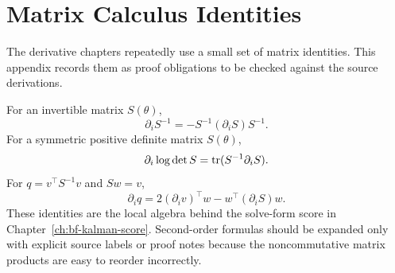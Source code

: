 \chapter{Matrix Calculus Identities}
\label{app:bf-matrix-calculus}

The derivative chapters repeatedly use a small set of matrix identities.  This
appendix records them as proof obligations to be checked against the source
derivations.

For an invertible matrix $S(\theta)$,
\[
  \partial_i S^{-1}
  =
  -S^{-1}(\partial_i S)S^{-1}.
\]
For a symmetric positive definite matrix $S(\theta)$,
\[
  \partial_i \log\det S
  =
  \operatorname{tr}(S^{-1}\partial_i S).
\]
For $q=v^\top S^{-1}v$ and $S w=v$,
\[
  \partial_i q
  =
  2(\partial_i v)^\top w
  -w^\top(\partial_i S)w.
\]
These identities are the local algebra behind the solve-form score in
Chapter~\ref{ch:bf-kalman-score}.  Second-order formulas should be expanded
only with explicit source labels or proof notes because the noncommutative
matrix products are easy to reorder incorrectly.
